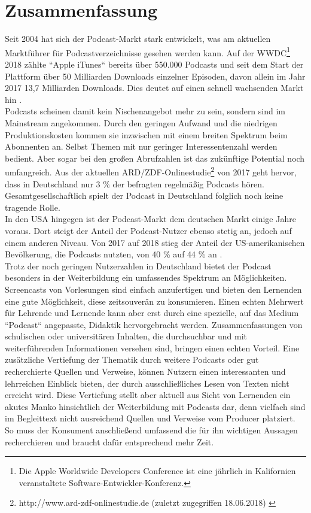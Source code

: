 \documentclass[11pt,a4paper]{scrreprt}
\begin{document}
\chapter{Zusammenfassung}
\thispagestyle{fancy}
Seit 2004 hat sich der Podcast-Markt stark entwickelt, was am aktuellen Marktführer für Podcastverzeichnisse gesehen werden kann. Auf der WWDC\footnote{Die Apple Worldwide Developers Conference ist eine jährlich in Kalifornien veranstaltete Software-Entwickler-Konferenz.} 2018 zählte ``Apple iTunes`` bereits über 550.000 Podcasts und seit dem Start der Plattform über 50 Milliarden Downloads einzelner Episoden, davon allein im Jahr 2017 13,7 Milliarden Downloads. Dies deutet auf einen schnell wachsenden Markt hin \cite{Heater2018}.\\ 
Podcasts scheinen damit kein Nischenangebot mehr zu sein, sondern sind im Mainstream angekommen. Durch den geringen Aufwand und die niedrigen Produktionskosten kommen sie inzwischen mit einem breiten Spektrum beim Abonnenten an. Selbst Themen mit nur geringer Interessentenzahl werden bedient. Aber sogar bei den großen Abrufzahlen ist das zukünftige Potential noch umfangreich. Aus der aktuellen ARD/ZDF-Onlinestudie\footnote{http://www.ard-zdf-onlinestudie.de (zuletzt zugegriffen 18.06.2018) \cite{ARD/ZDF-Medienkommission2017}} von 2017 geht hervor, dass in Deutschland nur 3 \% der befragten regelmäßig Podcasts hören. Gesamtgesellschaftlich spielt der Podcast in Deutschland folglich noch keine tragende Rolle.\\In den USA hingegen ist der Podcast-Markt dem deutschen Markt einige Jahre voraus. Dort steigt der Anteil der Podcast-Nutzer ebenso stetig an, jedoch auf einem anderen Niveau. Von 2017 auf 2018 stieg der Anteil der US-amerikanischen Bevölkerung, die Podcasts nutzten, von 40 \% auf 44 \% an \cite{Statista2018}.\\
Trotz der noch geringen Nutzerzahlen in Deutschland bietet der Podcast besonders in der Weiterbildung ein umfassendes Spektrum an Möglichkeiten. Screencasts von Vorlesungen sind einfach anzufertigen und bieten den Lernenden eine gute Möglichkeit, diese zeitsouverän zu konsumieren. Einen echten Mehrwert für Lehrende und Lernende kann aber erst durch eine spezielle, auf das Medium ``Podcast`` angepasste, Didaktik hervorgebracht werden. Zusammenfassungen von schulischen oder universitären Inhalten, die durchsuchbar und mit weiterführenden Informationen versehen sind, bringen einen echten Vorteil. Eine zusätzliche Vertiefung der Thematik durch weitere Podcasts oder gut recherchierte Quellen und Verweise, können Nutzern einen interessanten und lehrreichen Einblick bieten, der durch ausschließliches Lesen von Texten nicht erreicht wird. Diese Vertiefung stellt aber aktuell aus Sicht von Lernenden ein akutes Manko hinsichtlich der Weiterbildung mit Podcasts dar, denn vielfach sind im Begleittext nicht ausreichend Quellen und Verweise vom Producer platziert. So muss der Konsument anschließend umfassend die für ihn wichtigen Aussagen recherchieren und braucht dafür entsprechend mehr Zeit. \\
\end{document}
